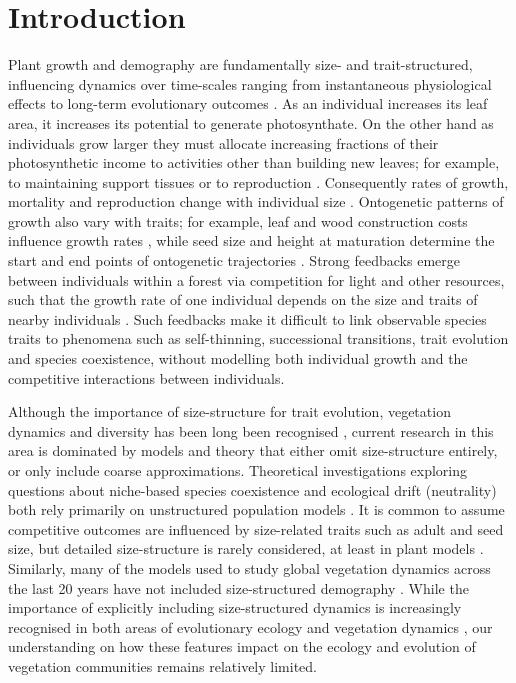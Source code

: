 \documentclass[a4paper,11pt]{article}
\begin{document}
\section{Introduction}\label{introduction}

Plant growth and demography are fundamentally size- and
trait-structured, influencing dynamics over time-scales ranging from
instantaneous physiological effects to long-term evolutionary outcomes
\citep{Harper-1977, Westoby-2002}.
%
As an individual increases its leaf area, it increases its potential
to generate photosynthate.
%
On the other hand as individuals grow larger they must allocate increasing
fractions of their photosynthetic income to activities other
than building new leaves; for example, to maintaining support tissues
\citep{Givnish-1988, Enquist-2007} or to reproduction
\citep{Thomas-2011}.
%
Consequently rates of growth, mortality and reproduction change with
individual size \citep{Muller-2006, Ruger-2011, Thomas-2011}.
Ontogenetic
patterns of growth also vary with traits; for example,
leaf and wood construction costs influence growth rates
\citep{Wright-2010}, while seed size and height
at maturation determine the start and end points of ontogenetic
trajectories \citep{Westoby-2002}.
%
Strong feedbacks emerge between individuals within a forest via
competition for light and other resources, such that the growth rate
of one individual depends on the size and traits of nearby
individuals \citep{Shugart-1980, Pacala-1996}.
%
Such feedbacks make it difficult to link observable species traits to
phenomena such as self-thinning, successional transitions, trait
evolution and species coexistence, without
modelling both individual growth and the competitive interactions between
individuals.

Although the importance of size-structure for trait evolution, vegetation
dynamics and diversity has been long been recognised \citep[e.g.,][]{Harper-1977,
  Shugart-1980, Huston-1987}, current research in this area is
dominated by models and theory that either omit size-structure
entirely, or only include coarse approximations.
%
Theoretical investigations exploring questions about niche-based
species coexistence and ecological drift (neutrality) both rely
primarily on unstructured population models \citep[e.g.][]{MacArthur-1967,
  Tilman-1985, Geritz-1998, Hubbell-2001, Calcagno-2006}.
%
It is common to assume competitive outcomes are influenced by
size-related traits such as adult and seed size, but detailed
size-structure is rarely considered, at least in plant models
\cite[for animal examples, see][]{Deroos-1988, Deroos-1992}.
%
Similarly, many of the models used to study global vegetation dynamics across
the last 20 years have not included size-structured demography
\citep[for comparisons of some major models see][]{Sitch-2008,
Dekauwe-2014}.
%
While the importance of explicitly including size-structured dynamics is
increasingly recognised in both areas of evolutionary ecology
\citep[e.g.][]{Falster-2015} and vegetation dynamics
\citep[e.g.][]{Moorcroft-2001, Purves-2008, Smith-2014,
Weng-2015, Sakschewski-2015}, our understanding on how these features
impact on the ecology and evolution of vegetation communities remains
relatively limited.
\end{document}
